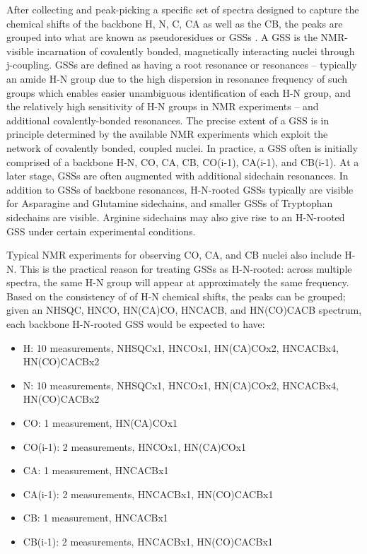 After collecting and peak-picking a specific set of spectra designed to 
capture the chemical shifts of the backbone H, N, C, CA as well as the CB, 
the peaks are grouped into what are known as pseudoresidues \cite{mars} 
or GSSs \cite{saga, ezassign, pistachio, autoassign1997, autoassign2001}.  
A GSS is the NMR-visible incarnation of covalently bonded, magnetically 
interacting nuclei through j-coupling.  GSSs are defined as having a root 
resonance or resonances -- typically an amide H-N group due to the high 
dispersion in resonance frequency of such groups which enables easier 
unambiguous identification of each H-N group, and the relatively high 
sensitivity of H-N groups in NMR experiments -- and additional 
covalently-bonded resonances.  The precise extent of a GSS is in principle 
determined by the available NMR experiments which exploit the network of 
covalently bonded, coupled nuclei.  In practice, a GSS often is initially 
comprised of a backbone H-N, CO, CA, CB, CO(i-1), CA(i-1), and CB(i-1).  
At a later stage, GSSs are often augmented with additional sidechain resonances.  
In addition to GSSs of backbone resonances, H-N-rooted GSSs typically are 
visible for Asparagine and Glutamine sidechains, and smaller GSSs of 
Tryptophan sidechains are visible.  Arginine sidechains may also give rise 
to an H-N-rooted GSS under certain experimental conditions. 
	
Typical NMR experiments for observing CO, CA, and CB nuclei also include H-N.  
This is the practical reason for treating GSSs as H-N-rooted: across multiple 
spectra, the same H-N group will appear at approximately the same frequency.  
Based on the consistency of of H-N chemical shifts, the peaks can be grouped; 
given an NHSQC, HNCO, HN(CA)CO, HNCACB, and HN(CO)CACB spectrum, each backbone 
H-N-rooted GSS would be expected to have:
\begin{itemize}
 \item H: 10 measurements, NHSQCx1, HNCOx1, HN(CA)COx2, HNCACBx4, HN(CO)CACBx2
 \item N: 10 measurements, NHSQCx1, HNCOx1, HN(CA)COx2, HNCACBx4, HN(CO)CACBx2
 \item CO: 1 measurement, HN(CA)COx1
 \item CO(i-1): 2 measurements, HNCOx1, HN(CA)COx1
 \item CA: 1 measurement, HNCACBx1
 \item CA(i-1): 2 measurements, HNCACBx1, HN(CO)CACBx1
 \item CB: 1 measurement, HNCACBx1
 \item CB(i-1): 2 measurements, HNCACBx1, HN(CO)CACBx1
\end{itemize}

